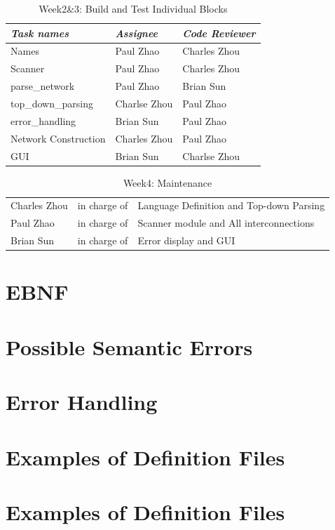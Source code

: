 \documentclass[12pt]{article}
\begin{document}
\begin{table}[H]
\begin{tabular}{p{5cm}p{4cm}p{3cm}} 
\textit{Task names} & \textit{Assignee} & \textit{Code Reviewer}\\
\hline
Names & Paul Zhao & Charles Zhou\\
Scanner & Paul Zhao & Charles Zhou\\
parse\_network & Paul Zhao & Brian Sun\\
top\_down\_parsing & Charlse Zhou & Paul Zhao\\
error\_handling & Brian Sun & Paul Zhao\\
Network Construction & Charles Zhou & Paul Zhao\\
GUI & Brian Sun & Charlse Zhou\\
\end{tabular}
\caption{Week2\&3: Build and Test Individual Blocks}
\end{table}

\begin{table}[H]
\begin{tabular}{p{3cm}p{4cm}p{8cm}} 
Charles Zhou & in charge of & Language Definition and Top-down Parsing\\
Paul Zhao & in charge of & Scanner module and All interconnections\\
Brian Sun & in charge of & Error display and GUI\\
\end{tabular}
\caption{Week4: Maintenance}
\end{table}

\section{EBNF}
\section{Possible Semantic Errors}
\section{Error Handling}
\section{Examples of Definition Files}

\section{Examples of Definition Files}
\end{document}
